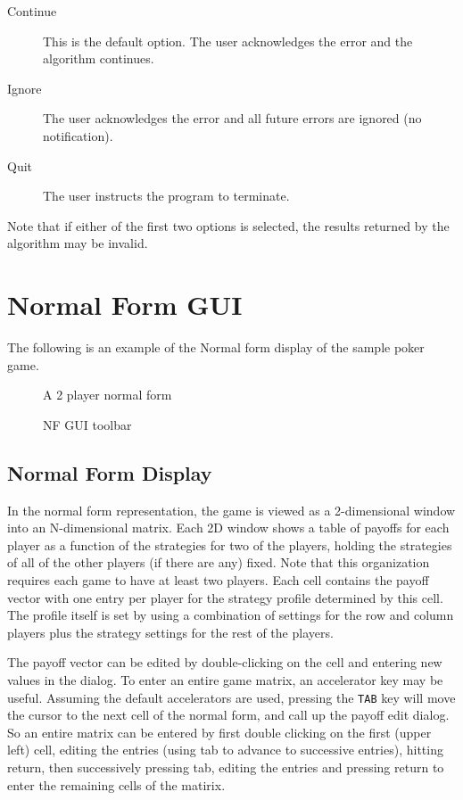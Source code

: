 \documentclass[12pt]{report}
\begin{document}
\begin{description}
\item[Continue] This is the default option.  The user acknowledges the
error and the algorithm continues.
\item[Ignore] The user acknowledges the error and all future errors
are ignored (no notification).
\item[Quit] The user instructs the program to terminate.
\end{description}

Note that if either of the first two options is selected, the results 
returned by the algorithm may be invalid.

\chapter{Normal Form GUI}\label{NFGUI}

The following is an example of the Normal form display of the sample
poker game.

\begin{figure}
\caption{A 2 player normal form}\label{fig_nfg}
\end{figure}

\begin{figure}
\caption{NF GUI toolbar}\label{fig_nfgtools}
\end{figure}

\section{Normal Form Display}

In the normal form representation, the game is viewed as a
2-dimensional window into an N-dimensional matrix.  Each 2D window
shows a table of payoffs for each player as a function of the
strategies for two of the players, holding the strategies of all of
the other players (if there are any) fixed.  Note that this
organization requires each game to have at least two players.  Each
cell contains the payoff vector with one entry per player for the
strategy profile determined by this cell.  The profile itself is set
by using a combination of settings for the row and column players plus
the strategy settings for the rest of the players.  

The payoff vector can be edited by double-clicking on the cell and
entering new values in the dialog. To enter an entire game matrix, an
accelerator key may be useful.  Assuming the default accelerators are
used, pressing the {\tt TAB} key will move the cursor to the next cell
of the normal form, and call up the payoff edit dialog. So an entire
matrix can be entered by first double clicking on the first (upper
left) cell, editing the entries (using tab to advance to successive
entries), hitting return, then successively pressing tab, editing the
entries and pressing return to enter the remaining cells of the
matirix.
\end{document}
